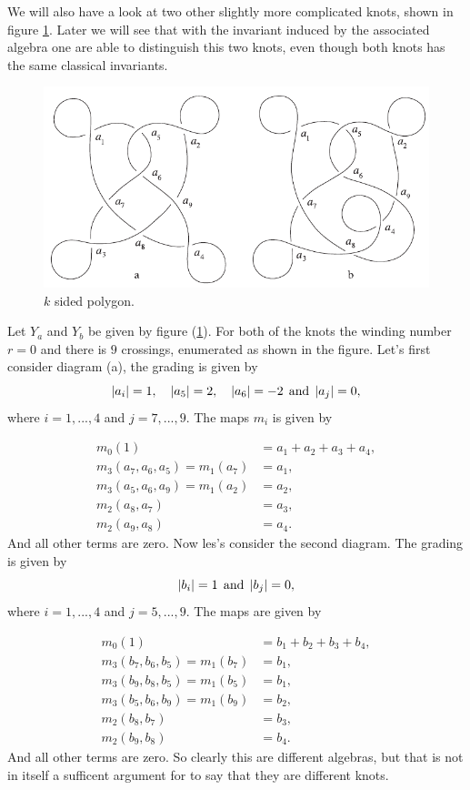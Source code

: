 We will also have a look at two other slightly more complicated knots, shown in
figure \ref{fig:chek_elias_knots}. Later we will see that with the invariant
induced by the associated \Ainf algebra one are able to distinguish this two
knots, even though both knots has the same classical invariants.

\begin{figure}
\centering
\includegraphics[width=.8\textwidth]{figs/chek_elias_knots.pdf}
\caption{$k$ sided polygon.}
\label{fig:chek_elias_knots}
\end{figure}

\begin{exmp}
Let $Y_a$ and $Y_b$ be given by figure (\ref{fig:chek_elias_knots}). 
For both of the knots the winding number $r=0$ and there is $9$ crossings,
enumerated as shown in the figure. Let's first consider diagram (a), the grading
is given by
\[ |a_i| = 1, \quad |a_5| = 2, \quad |a_6| = -2 \:\:\text{and}\:\: |a_j| = 0, \]
where $i = 1,...,4$ and $j = 7,...,9$. The \Ainf maps $m_i$ is given by

\begin{align*}
m_0(1) &= a_1 + a_2 + a_3 + a_4, \\
m_3(a_7,a_6,a_5) = m_1(a_7) &= a_1, \\
m_3(a_5,a_6,a_9) = m_1(a_2) &= a_2, \\
m_2(a_8,a_7) &= a_3, \\
m_2(a_9,a_8) &= a_4.
\end{align*}
And all other terms are zero. Now les's consider the second diagram. The grading
is given by
\[ |b_i| = 1 \:\:\text{and}\:\: |b_j| = 0, \]
where $i = 1,...,4$ and $j = 5,...,9$. The \Ainf maps are given by

\begin{align*}
m_0(1) &= b_1 + b_2 + b_3 + b_4, \\
m_3(b_7,b_6,b_5) = m_1(b_7) &= b_1, \\
m_3(b_9,b_8,b_5) = m_1(b_5) &= b_1, \\
m_3(b_5,b_6,b_9) = m_1(b_9) &= b_2, \\
m_2(b_8,b_7) &= b_3, \\
m_2(b_9,b_8) &= b_4.
\end{align*}
And all other terms are zero. So clearly this are different \Ainf algebras, but
that is not in itself a sufficent argument for to say that they are different
knots.

\end{exmp}
